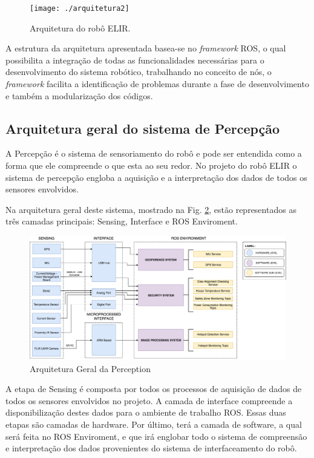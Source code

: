 \begin{figure} [h!]	
	\caption{Arquitetura do robô ELIR.}
	\label{img:elirarq}											 
	\centering													 
	\texttt{[image: ./arquitetura2]}
\end{figure}													 



A estrutura da arquitetura apresentada basea-se no \textit{framework} ROS, o qual possibilita a integração de todas as funcionalidades necessárias para o desenvolvimento do sistema robótico, trabalhando no conceito de nós, o \textit{framework} facilita a identificação de problemas durante a fase de desenvolvimento e também a modularização dos códigos.
\subsection{Arquitetura geral do sistema de Percepção}
\label{ssec:arqg}
A Percepção é o sistema de sensoriamento do robô e pode ser entendida como a forma que ele compreende o que esta ao seu redor. No projeto do robô ELIR o sistema de percepção engloba a aquisição e a interpretação dos dados de todos os sensores envolvidos.

Na arquitetura geral deste sistema, mostrado na Fig. \ref{arqgeral}, estão representados as três camadas principais: Sensing, Interface e ROS Enviroment.

\begin{figure}[!ht]
\centering
\includegraphics[width=15cm]{Figures/ArquiteturaPerceptionv2.png}
\caption{Arquitetura Geral da Perception}\label{arqgeral}
\end{figure}

 A etapa de Sensing é composta por todos os processos de aquisição de dados de todos os sensores envolvidos no projeto. A camada de interface compreende a disponibilização destes dados para o ambiente de trabalho ROS. Essas duas etapas são camadas de hardware. Por último, terá a camada de software, a qual será feita no ROS Enviroment, e que irá englobar todo o sistema de compreensão e interpretação dos dados provenientes do sistema de interfaceamento do robô.
 
